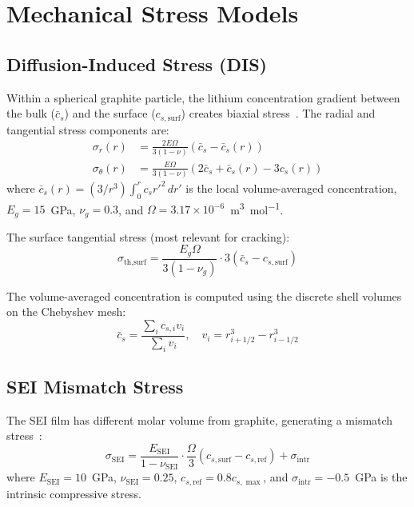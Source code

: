 \section{Mechanical Stress Models}
\label{sec:stress_models}

\subsection{Diffusion-Induced Stress (DIS)}

Within a spherical graphite particle, the lithium concentration gradient between the bulk ($\bar{c}_s$) and the surface ($c_{s,\text{surf}}$) creates biaxial stress~\cite{Christensen2006}. The radial and tangential stress components are:
\begin{align}
  \sigma_r(r) &= \frac{2E\Omega}{3(1-\nu)}\left(\bar{c}_s - \bar{c}_s(r)\right) \label{eq:sigma_r}\\
  \sigma_\theta(r) &= \frac{E\Omega}{3(1-\nu)}\left(2\bar{c}_s + \bar{c}_s(r) - 3 c_s(r)\right) \label{eq:sigma_theta}
\end{align}
where $\bar{c}_s(r) = (3/r^3)\int_0^r c_s r'^2\,dr'$ is the local volume-averaged concentration, $E_g = 15$~GPa, $\nu_g = 0.3$, and $\Omega = 3.17\times10^{-6}$~\si{\meter\cubed\per\mol}.

The surface tangential stress (most relevant for cracking):
\begin{equation}
  \sigma_\text{th,surf} = \frac{E_g\Omega}{3(1-\nu_g)}\cdot 3(\bar{c}_s - c_{s,\text{surf}})
  \label{eq:sigma_th_surf}
\end{equation}

The volume-averaged concentration is computed using the discrete shell volumes on the Chebyshev mesh:
\begin{equation}
  \bar{c}_s = \frac{\sum_i c_{s,i} v_i}{\sum_i v_i}, \quad v_i = r_{i+1/2}^3 - r_{i-1/2}^3
  \label{eq:c_bar}
\end{equation}

\subsection{SEI Mismatch Stress}

The SEI film has different molar volume from graphite, generating a mismatch stress~\cite{Reniers2019}:
\begin{equation}
  \sigma_\text{SEI} = \frac{E_\text{SEI}}{1-\nu_\text{SEI}} \cdot \frac{\Omega}{3}(c_{s,\text{surf}} - c_{s,\text{ref}}) + \sigma_\text{intr}
  \label{eq:sigma_sei}
\end{equation}
where $E_\text{SEI} = 10$~GPa, $\nu_\text{SEI} = 0.25$, $c_{s,\text{ref}} = 0.8 c_{s,\max}$, and $\sigma_\text{intr} = -0.5$~GPa is the intrinsic compressive stress.

